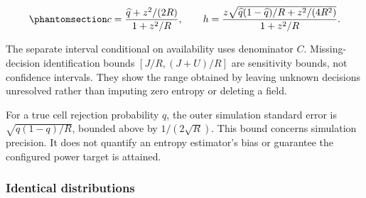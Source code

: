 \documentclass[
  english,
  11pt,
]{article}
\begin{document}
\begin{equation}\protect\phantomsection\label{eq:wilson}{
c=\frac{\widehat q+z^2/(2R)}{1+z^2/R},\qquad
h=\frac{z\sqrt{\widehat q(1-\widehat q)/R+z^2/(4R^2)}}{1+z^2/R}.
}\end{equation}

The separate interval conditional on availability uses denominator
\(C\). Missing-decision identification bounds \([J/R,(J+U)/R]\) are
sensitivity bounds, not confidence intervals. They show the range
obtained by leaving unknown decisions unresolved rather than imputing
zero entropy or deleting a field.

For a true cell rejection probability \(q\), the outer simulation
standard error is \(\sqrt{q(1-q)/R}\), bounded above by
\(1/(2\sqrt R)\). This bound concerns simulation precision. It does not
quantify an entropy estimator's bias or guarantee the configured power
target is attained.

\subsubsection{Identical distributions}\label{identical-distributions}
\end{document}
